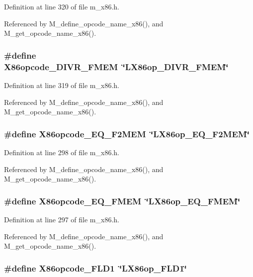 Definition at line 320 of file m\_\-x86.h.

Referenced by M\_\-define\_\-opcode\_\-name\_\-x86(), and M\_\-get\_\-opcode\_\-name\_\-x86().
\subsubsection{\setlength{\rightskip}{0pt plus 5cm}\#define X86opcode\_\-DIVR\_\-FMEM~\char`\"{}LX86op\_\-DIVR\_\-FMEM\char`\"{}}\label{m__x86_8h_e4d00390b9c4d5337f21021826ffbb80}




Definition at line 319 of file m\_\-x86.h.

Referenced by M\_\-define\_\-opcode\_\-name\_\-x86(), and M\_\-get\_\-opcode\_\-name\_\-x86().
\subsubsection{\setlength{\rightskip}{0pt plus 5cm}\#define X86opcode\_\-EQ\_\-F2MEM~\char`\"{}LX86op\_\-EQ\_\-F2MEM\char`\"{}}\label{m__x86_8h_8a75c4313544aba87242b3c628fb5717}




Definition at line 298 of file m\_\-x86.h.

Referenced by M\_\-define\_\-opcode\_\-name\_\-x86(), and M\_\-get\_\-opcode\_\-name\_\-x86().
\subsubsection{\setlength{\rightskip}{0pt plus 5cm}\#define X86opcode\_\-EQ\_\-FMEM~\char`\"{}LX86op\_\-EQ\_\-FMEM\char`\"{}}\label{m__x86_8h_84249111aa287fd6eaa9aef842f8b9ff}




Definition at line 297 of file m\_\-x86.h.

Referenced by M\_\-define\_\-opcode\_\-name\_\-x86(), and M\_\-get\_\-opcode\_\-name\_\-x86().
\subsubsection{\setlength{\rightskip}{0pt plus 5cm}\#define X86opcode\_\-FLD1~\char`\"{}LX86op\_\-FLD1\char`\"{}}\label{m__x86_8h_924434a482a69b6695d11165f590719c}




